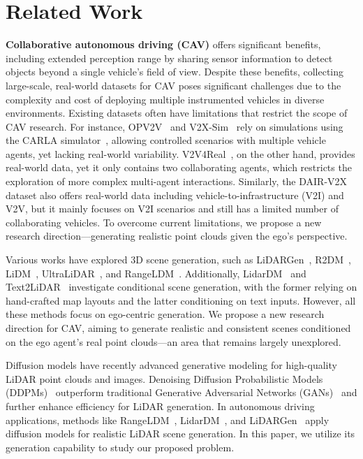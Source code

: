 \section{Related Work}
\label{sec:related}
\textbf{Collaborative autonomous driving (CAV)} offers significant benefits, including extended perception range by sharing sensor information to detect objects beyond a single vehicle's field of view.
Despite these benefits, collecting large-scale, real-world datasets for CAV poses significant challenges due to the complexity and cost of deploying multiple instrumented vehicles in diverse environments. Existing datasets often have limitations that restrict the scope of CAV research. For instance, OPV2V~\cite{xu2022opv2v} and V2X-Sim~\cite{li2022v2xsim} rely on simulations using the CARLA simulator~\citep{Dosovitskiy17carla}, allowing controlled scenarios with multiple vehicle agents, yet lacking real-world variability. V2V4Real~\cite{xu2023v2v4real}, on the other hand, provides real-world data, yet it only contains two collaborating agents, which restricts the exploration of more complex multi-agent interactions. Similarly, the DAIR-V2X~\cite{dair-v2x} dataset also offers real-world data including vehicle-to-infrastructure (V2I) and V2V, but it mainly focuses on V2I scenarios and still has a limited number of collaborating vehicles. To overcome current limitations, we propose a new research direction---generating realistic point clouds given the ego's perspective. 

 Various works have explored 3D scene generation, such as LiDARGen~\cite{zyrianov2022learning-lidargen}, R2DM~\cite{nakashima2024lidar-r2dm}, LiDM~\cite{ran2024towards}, UltraLiDAR~\citep{xiong2023learning}, and RangeLDM~\cite{hu2025rangeldm}. Additionally, LidarDM~\cite{zyrianov2024lidardm} and Text2LiDAR~\cite{wu2024text2lidar} investigate conditional scene generation, with the former relying on hand-crafted map layouts and the latter conditioning on text inputs. However, all these methods focus on ego-centric generation. We propose a new research direction for CAV, aiming to generate realistic and consistent scenes conditioned on the ego agent's real point clouds---an area that remains largely unexplored.



Diffusion models have recently advanced generative modeling for high-quality LiDAR point clouds and images. Denoising Diffusion Probabilistic Models (DDPMs)~\cite{ho2020denoising} outperform traditional Generative Adversarial Networks (GANs)~\cite{goodfellow2014generative} and further enhance efficiency for LiDAR generation. In autonomous driving applications, methods like RangeLDM~\cite{hu2025rangeldm}, LidarDM~\cite{zyrianov2024lidardm}, and LiDARGen~\cite{zyrianov2022learning-lidargen} apply diffusion models for realistic LiDAR scene generation. In this paper, we utilize its generation capability to study our proposed problem.